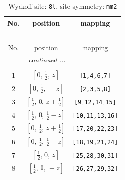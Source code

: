 \documentclass[fleqn,8pt]{jsarticle}
\begin{document}
\begin{longtable}{ccc}
\caption{Wyckoff site: {\tt 8l}, site symmetry: {\tt mm2}}
 \\
 \hline \hline
No. & position & mapping \\ \hline \endfirsthead

\multicolumn{2}{l}{\tablename\ \thetable{}} \\
 \hline \hline
No. & position & mapping \\ \hline \endhead

 \hline \hline
\multicolumn{2}{r}{\footnotesize\it continued ...} \\ \endfoot

 \hline \hline
\multicolumn{2}{r}{} \\ \endlastfoot

1 & $\left[ 0,\, \frac{1}{2},\, z \right]$ & {\tt [1,4,6,7]} \\ \hline
2 & $\left[ 0,\, \frac{1}{2},\, - z \right]$ & {\tt [2,3,5,8]} \\ \hline
3 & $\left[ \frac{1}{2},\, 0,\, z + \frac{1}{2} \right]$ & {\tt [9,12,14,15]} \\ \hline
4 & $\left[ \frac{1}{2},\, 0,\, \frac{1}{2} - z \right]$ & {\tt [10,11,13,16]} \\ \hline
5 & $\left[ 0,\, \frac{1}{2},\, z + \frac{1}{2} \right]$ & {\tt [17,20,22,23]} \\ \hline
6 & $\left[ 0,\, \frac{1}{2},\, \frac{1}{2} - z \right]$ & {\tt [18,19,21,24]} \\ \hline
7 & $\left[ \frac{1}{2},\, 0,\, z \right]$ & {\tt [25,28,30,31]} \\ \hline
8 & $\left[ \frac{1}{2},\, 0,\, - z \right]$ & {\tt [26,27,29,32]} \\
\end{longtable}
\renewcommand{\arraystretch}{1.2}
\end{document}
